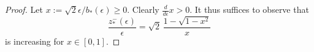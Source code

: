 \begin{proof}
	Let $x:=\sqrt{2} \epsilon/b_*(\epsilon) \geq 0$. Clearly $\frac{d}{d\epsilon} x >0$.
It thus suffices to observe that
\[
  \frac{z_*^- (\epsilon)}{\epsilon} = \sqrt{2}\,\frac{1 - \sqrt{1-x^2}}{x}
\]	
is increasing for $x \in [0,1]$. 
%
%
\end{proof}


